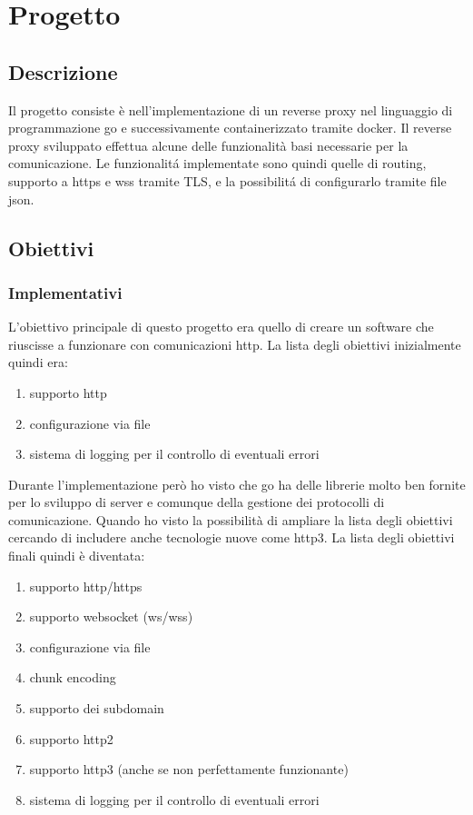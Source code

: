 \chapter{Progetto}
\label{cha:Progetto}

\section{Descrizione}
Il progetto consiste è nell'implementazione di un reverse proxy nel linguaggio di programmazione go e successivamente containerizzato tramite docker. Il reverse proxy sviluppato effettua alcune delle funzionalità basi necessarie per la comunicazione. Le funzionalitá implementate sono quindi quelle di routing, supporto a https e wss tramite TLS, e la possibilitá di configurarlo tramite file json.

\section{Obiettivi}
\subsection{Implementativi}
L'obiettivo principale di questo progetto era quello di creare un software che riuscisse a funzionare con comunicazioni http. La lista degli obiettivi inizialmente quindi era:
\begin{enumerate}
  \item supporto http
  \item configurazione via file
  \item sistema di logging per il controllo di eventuali errori
\end{enumerate}
Durante l'implementazione però ho visto che go ha delle librerie molto ben fornite per lo sviluppo di server e comunque della gestione dei protocolli di comunicazione. Quando ho visto la possibilità di ampliare la lista degli obiettivi cercando di includere anche tecnologie nuove come http3. La lista degli obiettivi finali quindi è diventata:
\begin{enumerate}
  \item supporto http/https
  \item supporto websocket (ws/wss)
  \item configurazione via file
  \item chunk encoding
  \item supporto dei subdomain
  \item supporto http2
  \item supporto http3 (anche se non perfettamente funzionante)
  \item sistema di logging per il controllo di eventuali errori
\end{enumerate}

